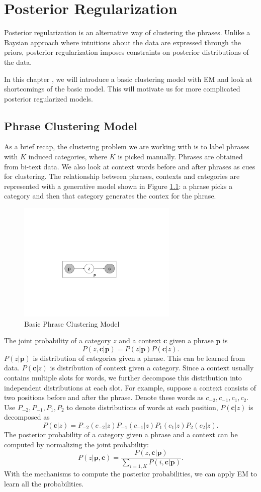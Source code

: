 \chapter{Posterior Regularization}
Posterior regularization is an alternative way of clustering the phrases.
Unlike a Baysian approach where intuitions about the data are expressed through the priors, posterior regularization imposes constraints on posterior distributions of the data.

In this chapter , we will introduce a basic clustering model with EM 
and look at shortcomings of the basic model. This will motivate us for
more complicated posterior regularized models.
\section{Phrase Clustering Model} 
As a brief recap, the clustering problem we are working with
is to label phrases with $K$ induced categories, where
$K$ is picked manually.
Phrases are obtained from bi-text data.
We also look at context
 words before and after
phrases as cues for clustering.
The relationship between phrases, contexts and categories are
represented with a generative model shown in 
Figure \ref{fig:EM}: a phrase picks a 
category and then that category generates the contex for the phrase.

\begin{figure}[h]
  \centering
  \includegraphics[width=3.0in]{pr-clustering/EMdigram}
  \caption{Basic Phrase Clustering Model}
  \label{fig:EM}
\end{figure}

The joint probability of a category $z$ and a context $\textbf{c}$ 
given a phrase $\textbf{p}$ is
\[
P(z,\textbf{c}|\textbf{p})=P(z|\textbf{p})P(\textbf{c}|z).
\]
$P(z|\textbf{p})$ is distribution of categories given a phrase.
This can be learned from data.
$P(\textbf{c}|z)$ is distribution of context given a category.
Since a context usually contains multiple slots for words, we further
decompose this distribution into independent distributions at
each slot. For example, suppose a context consists of two positions 
before and after the phrase. Denote these words as 
$c_{-2},c_{-1},c_1,c_2$.
Use $P_{-2},P_{-1},P_1,P_2$ to denote distributions of words at each 
position, $P(\textbf{c}|z)$ is decomposed as
\[
P(\textbf{c}|z)=P_{-2}(c_{-2}|z)P_{-1}
(c_{-1}|z)P_1(c_1|z)P_2(c_2|z).
\]
The posterior probability of a category given a phrase
and a context can be computed by normalizing the joint probability:
\[
P(z|\textbf{p},\textbf{c})=\frac{P(z,\textbf{c}|\textbf{p})}
{\sum_{i=1,K}P(i,\textbf{c}|\textbf{p})}.
\]
With the mechanisms to compute the posterior probabilities, we can 
apply EM to learn all the probabilities.

